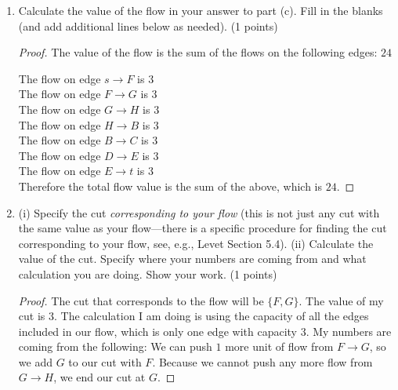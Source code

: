 \documentclass[11pt]{article}
\theoremstyle{definition}
\theoremstyle{definition}
\theoremstyle{definition}
\begin{document}
\begin{enumerate}
\begin{proof}[Answer]
\begin{comment}
	\path (H) edge node[ right] {$ 3 / 3$} (B);
	
	\end{tikzpicture}  
\end{center}
\end{comment}

\end{proof}

\vfill 
\newpage
\item Calculate the value of the flow in your answer to part (c). Fill in the blanks (and add additional lines below as needed). (1 points)

\begin{proof}
The value of the flow is the sum of the flows on the following edges: $24$ %

The flow on edge $s \to F$ is $3$\\
The flow on edge $F \to G$ is $3$\\
The flow on edge $G \to H$ is $3$\\
The flow on edge $H \to B$ is $3$\\
The flow on edge $B \to C$ is $3$\\
The flow on edge $D \to E$ is $3$\\
The flow on edge $E \to t$ is $3$\\

Therefore the total flow value is the sum of the above, which is $24$.
\end{proof}

\item (i) Specify the cut \emph{corresponding to your flow} (this is not just any cut with the same value as your flow---there is a specific procedure for finding the cut corresponding to your flow, see, e.g., Levet Section 5.4). (ii) Calculate the value of the cut. Specify where your numbers are coming from and what calculation you are doing. Show your work. (1 points)

\begin{proof}
The cut that corresponds to the flow will be $\{F, G\}$. The value of my cut is $3$. The calculation I am doing is using the capacity of all the edges included in our flow, which is only one edge with capacity $3$. My numbers are coming from the following: We can push $1$ more unit of flow from $F \to G$, so we add $G$ to our cut with $F$. Because we cannot push any more flow from $G \to H$, we end our cut at $G$.
\end{proof}
\vfill

\end{enumerate}




\end{document}
